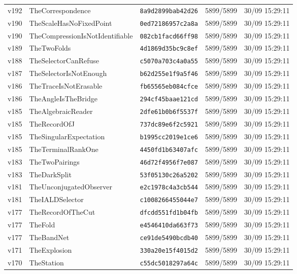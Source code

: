 \documentclass[11pt]{article}
\theoremstyle{definition}\newtheorem{deriv}{Derivation}
\begin{document}
{\begin{longtable}{@{}lllll@{}}
v192 & TheCorrespondence & \texttt{8a9d2899bab42d26} & 5899/5899 & 30/09 15:29:11 \\
v190 & TheScaleHasNoFixedPoint & \texttt{0ed72186957c2a8a} & 5899/5899 & 30/09 15:29:11 \\
v190 & TheCompressionIsNotIdentifiable & \texttt{082cb1facd66ff98} & 5899/5899 & 30/09 15:29:11 \\
v189 & TheTwoFolds & \texttt{4d1869d35bc9c8ef} & 5899/5899 & 30/09 15:29:11 \\
v188 & TheSelectorCanRefuse & \texttt{c5070a703c4a0a55} & 5899/5899 & 30/09 15:29:11 \\
v187 & TheSelectorIsNotEnough & \texttt{b62d255e1f9a5f46} & 5899/5899 & 30/09 15:29:11 \\
v186 & TheTraceIsNotErasable & \texttt{fb65565eb084cfce} & 5899/5899 & 30/09 15:29:11 \\
v186 & TheAngleIsTheBridge & \texttt{294cf45baae121cd} & 5899/5899 & 30/09 15:29:11 \\
v185 & TheAlgebraicReader & \texttt{2dfe61b0b6f5537f} & 5899/5899 & 30/09 15:29:11 \\
v185 & TheRecordOfJ & \texttt{737dc89e6f2c5921} & 5899/5899 & 30/09 15:29:11 \\
v185 & TheSingularExpectation & \texttt{b1995cc2019e1ce6} & 5899/5899 & 30/09 15:29:11 \\
v185 & TheTerminalRankOne & \texttt{4450fd1b63407afc} & 5899/5899 & 30/09 15:29:11 \\
v183 & TheTwoPairings & \texttt{46d72f4956f7e087} & 5899/5899 & 30/09 15:29:11 \\
v183 & TheDarkSplit & \texttt{53f05130c26a5202} & 5899/5899 & 30/09 15:29:11 \\
v181 & TheUnconjugatedObserver & \texttt{e2c1978c4a3cb544} & 5899/5899 & 30/09 15:29:11 \\
v181 & TheIALDSelector & \texttt{c1008266455044e7} & 5899/5899 & 30/09 15:29:11 \\
v177 & TheRecordOfTheCut & \texttt{dfcdd551fd1b04fb} & 5899/5899 & 30/09 15:29:11 \\
v177 & TheFold & \texttt{e4546410da663f73} & 5899/5899 & 30/09 15:29:11 \\
v177 & TheBandNet & \texttt{ce91de5490bcdb40} & 5899/5899 & 30/09 15:29:11 \\
v171 & TheExplosion & \texttt{330a20e15f4015d2} & 5899/5899 & 30/09 15:29:11 \\
v170 & TheStation & \texttt{c55dc5018297a64c} & 5899/5899 & 30/09 15:29:11 \\

\end{longtable}}
\end{document}
